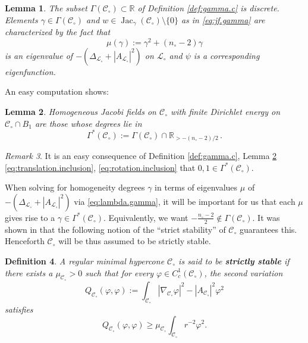 \documentclass[11pt, letterpaper, reqno]{amsart}
\numberwithin{equation}{section}
\newtheorem{Def}{Definition}[section]
\newtheorem{Lem}[Def]{Lemma}
\theoremstyle{remark}
\newtheorem{Rem}[Def]{Remark}
\newcommand{\RR}{\mathbb{R}}
\newcommand{\cC}{\mathcal{C}}
\newcommand{\cL}{\mathcal{L}}
\newcommand{\Jac}{\operatorname{Jac}}
\begin{document}
\begin{Lem} \label{lemm:gamma.c0.discrete}
	The subset $\Gamma(\cC_\circ) \subset \RR$ of Definition \ref{def:gamma.c} is discrete. Elements $\gamma \in \Gamma(\cC_\circ)$ and $w \in \Jac_\gamma(\cC_\circ) \setminus \{ 0 \}$ as in \eqref{eq:jf.gamma} are characterized by the fact that
	\begin{equation} \label{eq:lambda.gamma}
		\mu(\gamma):=\gamma^2 + (n_\circ-2)\gamma
	\end{equation}
	is an eigenvalue of $-(\Delta_{\cL_\circ} + |A_{\cL_\circ}|^2)$ on $\cL_\circ$ and $\psi$ is a corresponding eigenfunction.
\end{Lem}

An easy computation shows:

\begin{Lem} \label{lemm:gamma.star.c}
	Homogeneous Jacobi fields on $\cC_\circ$ with finite Dirichlet energy on $\cC_\circ\cap B_1$ are those whose degrees lie in
	\begin{equation*}
		\Gamma^*(\cC_\circ) := \Gamma(\cC_\circ) \cap \RR_{> -(n_\circ-2)/2} \,. 
	\end{equation*}
\end{Lem}

\begin{Rem} \label{rema:gamma.star.c0.contains.01}
	It is an easy consequence of Definition \ref{def:gamma.c}, Lemma \ref{lemm:gamma.star.c} \eqref{eq:translation.inclusion}, \eqref{eq:rotation.inclusion} that $0, 1 \in \Gamma^*(\cC_\circ)$.
\end{Rem}

When solving for homogeneity degrees $\gamma$ in terms of eigenvalues $\mu$ of $-(\Delta_{\cL_\circ}+|A_{\cL_\circ}|^2)$ via \eqref{eq:lambda.gamma}, it will be important for us that each $\mu$ gives rise to a $\gamma \in \Gamma^*(\cC_\circ)$. Equivalently, we want $-\tfrac{n_\circ-2}{2} \not \in \Gamma(\cC_\circ)$. It was shown in \cite[Section 1.6]{HardtSimon:isolated} that the following notion of the ``strict stability'' of $\cC_\circ$ guarantees this. Henceforth $\cC_\circ$ will be thus assumed to be strictly stable.

\begin{Def} \label{defi:strictly.stable}
	A regular minimal hypercone $\cC_\circ$ is said to be \textbf{strictly stable} if there exists a $\mu_{\cC_\circ}> 0$ such that for every $\varphi\in C_c^1(\cC_\circ)$, the second variation 
      \[ Q_{\cC_\circ}(\varphi, \varphi) := \int_{\cC_\circ} |\nabla_{\cC_\circ} \varphi|^2 - |A_{\cC_\circ}|^2\varphi^2 \]
      satisfies
      \[ Q_{\cC_\circ}(\varphi, \varphi) \geq \mu_{\cC_\circ}\int_{\cC_\circ} r^{-2}\varphi^2. \]
\end{Def}
\end{document}
